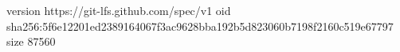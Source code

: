 version https://git-lfs.github.com/spec/v1
oid sha256:5f6e12201ed2389164067f3ac9628bba192b5d823060b7198f2160c519e67797
size 87560

